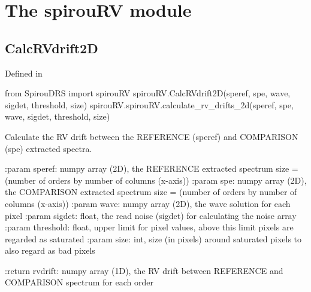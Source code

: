
\clearpage
\newpage
\noindent\begin{minipage}{\textwidth}
\section{The spirouRV module}
\label{ch:the_module:spirouRV}

\subsection{CalcRVdrift2D}

Defined in \spirouRV{}

\begin{pythonbox}
from SpirouDRS import spirouRV
spirouRV.CalcRVdrift2D(speref, spe, wave, sigdet, threshold, size)
spirouRV.spirouRV.calculate_rv_drifts_2d(speref, spe, wave, sigdet, threshold, size)
\end{pythonbox}

\begin{pythondocstring}
Calculate the RV drift between the REFERENCE (speref) and COMPARISON (spe)
extracted spectra.

:param speref: numpy array (2D), the REFERENCE extracted spectrum
               size = (number of orders by number of columns (x-axis))
:param spe:  numpy array (2D), the COMPARISON extracted spectrum
             size = (number of orders by number of columns (x-axis))
:param wave: numpy array (2D), the wave solution for each pixel
:param sigdet: float, the read noise (sigdet) for calculating the
               noise array
:param threshold: float, upper limit for pixel values, above this limit
                  pixels are regarded as saturated
:param size: int, size (in pixels) around saturated pixels to also regard
             as bad pixels

:return rvdrift: numpy array (1D), the RV drift between REFERENCE and
                 COMPARISON spectrum for each order
\end{pythondocstring}
\end{minipage}

